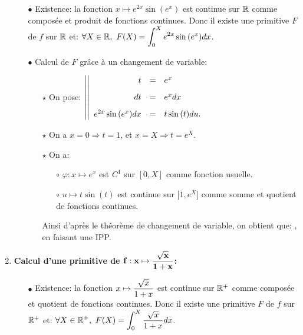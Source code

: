 \documentclass[a4paper, 11pt,reqno]{article}
\begin{document}
\begin{correction}
\begin{enumerate}
		      \begin{itemize}
			      \item[$\bullet$] Existence: la fonction $x\mapsto  e^{2x}\sin{(e^x)} $ est continue sur $\mathbb{R}$ comme compos\'ee et produit de fonctions continues. Donc il existe une primitive $F$ de $f$ sur $\mathbb{R}$ et: $ \displaystyle \forall X\in\mathbb{R},\ F(X)=\int_0^X e^{2x}\sin{(e^x)} dx$.
			      \item[$\bullet$] Calcul de $F$ gr\^{a}ce \`{a} un changement de variable:
			            \begin{itemize}
				            \item[$\star$] On pose: $\left| \left|\begin{array}{rll}
						                  t                     & = & e^x\vsec      \\
						                  dt                    & = & e^x dx \vsec  \\
						                  e^{2x}\sin{(e^x)}  dx & = & t\sin{(t)}du.
					                  \end{array}\right.\right.$
				            \item[$\star$] On a $x=0 \Rightarrow t=1$, et $x=X \Rightarrow t= e^X$.
				            \item[$\star$] On a:
				                  \begin{itemize}
					                  \item[$\circ$] $\varphi: x\mapsto e^x$ est $C^1$ sur $\left\lbrack 0,X \right\rbrack$ comme fonction usuelle.
					                  \item[$\circ$] $u\mapsto  t\sin{(t)}$ est continue sur $\lbrack 1,e^X\rbrack$ comme somme et quotient de fonctions continues.
				                  \end{itemize}
				                  Ainsi d'apr\`{e}s le th\'eor\`{e}me de changement de variable, on obtient que:
				                  , en faisant une IPP.
			            \end{itemize}
		      \end{itemize}
		\item \textbf{Calcul d'une primitive de $\mathbf{f: x\mapsto \displaystyle\frac{\sqrt{x}}{ 1+x} }$:}
		      \begin{itemize}
			      \item[$\bullet$] Existence: la fonction $x\mapsto  \displaystyle\frac{\sqrt{x}}{ 1+x}  $ est continue sur $\mathbb{R}^+$ comme compos\'ee et quotient de fonctions continues. Donc il existe une primitive $F$ de $f$ sur $\mathbb{R}^+$ et: $ \displaystyle \forall X\in\mathbb{R}^+,\ F(X)=\int_0^X \displaystyle\frac{\sqrt{x}}{ 1+x} dx$.

\end{itemize}
\end{enumerate}
\end{correction}
\end{document}
